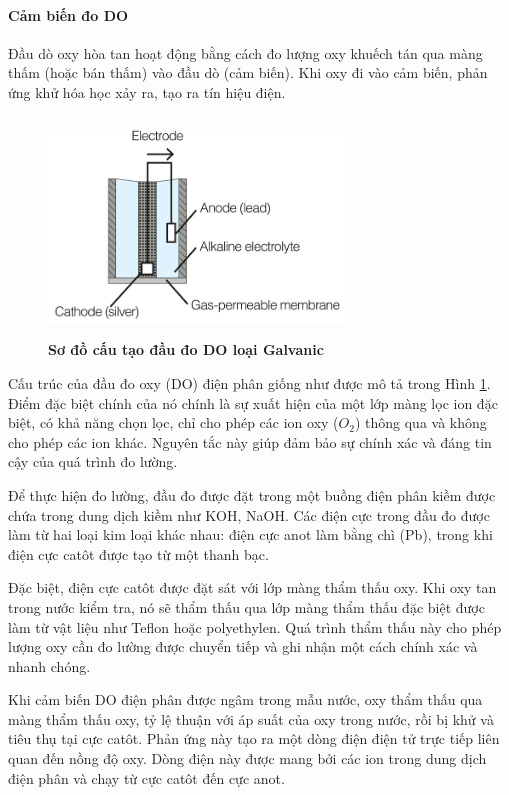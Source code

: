 \documentclass{article} %
\begin{document}
	\paragraph{Cảm biến đo DO }\mbox{}
	
	Đầu dò oxy hòa tan hoạt động bằng cách đo lượng oxy khuếch tán qua màng thấm (hoặc bán thấm) vào đầu dò (cảm biến). Khi oxy đi vào cảm biến, phản ứng khử hóa học xảy ra, tạo ra tín hiệu điện.
	
	\begin{figure}[!ht]
		\centering
		\includegraphics[width=8cm,height=5.8cm]{Images/DO.png}
		\caption[Sơ đồ cấu tạo đầu đo DO loại Galvanic\cite{LAQUA}]{\bfseries \fontsize{12pt}{0pt}\selectfont Sơ đồ cấu tạo đầu đo DO loại Galvanic\cite{LAQUA}}
		\label{DO}
	\end{figure}
	
	Cấu trúc của đầu đo oxy (DO) điện phân giống như được mô tả trong Hình \ref{DO}. Điểm đặc biệt chính của nó chính là sự xuất hiện của một lớp màng lọc ion đặc biệt, có khả năng chọn lọc, chỉ cho phép các ion oxy ($O_2$) thông qua và không cho phép các ion khác. Nguyên tắc này giúp đảm bảo sự chính xác và đáng tin cậy của quá trình đo lường.
	
	Để thực hiện đo lường, đầu đo được đặt trong một buồng điện phân kiềm được chứa trong dung dịch kiềm như KOH, NaOH. Các điện cực trong đầu đo được làm từ hai loại kim loại khác nhau: điện cực anot làm bằng chì (Pb), trong khi điện cực catôt được tạo từ một thanh bạc. 
	
	Đặc biệt, điện cực catôt được đặt sát với lớp màng thẩm thấu oxy. Khi oxy tan trong nước kiểm tra, nó sẽ thẩm thấu qua lớp màng thẩm thấu đặc biệt được làm từ vật liệu như Teflon hoặc polyethylen. Quá trình thẩm thấu này cho phép lượng oxy cần đo lường được chuyển tiếp và ghi nhận một cách chính xác và nhanh chóng.
	
	Khi cảm biến DO điện phân được ngâm trong mẫu nước, oxy thẩm thấu qua màng thẩm thấu oxy, tỷ lệ thuận với áp suất của oxy trong nước, rồi bị khử và tiêu thụ tại cực catôt. Phản ứng này tạo ra một dòng điện điện tử trực tiếp liên quan đến nồng độ oxy. Dòng điện này được mang bởi các ion trong dung dịch điện phân và chạy từ cực catôt đến cực anot.
	
\end{document}
